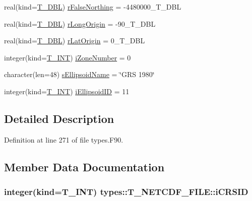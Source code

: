 \begin{DoxyCompactItemize}
\item 
real(kind=\hyperlink{namespacetypes_a888737411068474a167b1c3e5b579c58}{T\_\-DBL}) \hyperlink{typetypes_1_1_t___n_e_t_c_d_f___f_i_l_e_a03e8f9f6b812c9414c76c392b35c28a4}{rFalseNorthing} = -\/4480000\_\-T\_\-DBL
\item 
real(kind=\hyperlink{namespacetypes_a888737411068474a167b1c3e5b579c58}{T\_\-DBL}) \hyperlink{typetypes_1_1_t___n_e_t_c_d_f___f_i_l_e_addf7ab3c2b1f091b25eff5022f997522}{rLongOrigin} = -\/90\_\-T\_\-DBL
\item 
real(kind=\hyperlink{namespacetypes_a888737411068474a167b1c3e5b579c58}{T\_\-DBL}) \hyperlink{typetypes_1_1_t___n_e_t_c_d_f___f_i_l_e_a0ec0a310a81bdbc04a5574af35d4cf02}{rLatOrigin} = 0\_\-T\_\-DBL
\item 
integer(kind=\hyperlink{namespacetypes_a4e4d040a4425196c4d43be63e7e6103a}{T\_\-INT}) \hyperlink{typetypes_1_1_t___n_e_t_c_d_f___f_i_l_e_a3d905f146a75982f5e4d3f8fb1711604}{iZoneNumber} = 0
\item 
character(len=48) \hyperlink{typetypes_1_1_t___n_e_t_c_d_f___f_i_l_e_a2c4ffa327d4722e7d7650a33d5d05ed4}{sEllipsoidName} = \char`\"{}GRS 1980\char`\"{}
\item 
integer(kind=\hyperlink{namespacetypes_a4e4d040a4425196c4d43be63e7e6103a}{T\_\-INT}) \hyperlink{typetypes_1_1_t___n_e_t_c_d_f___f_i_l_e_ac7c2db95732921f3b0deb1913d6c42aa}{iEllipsoidID} = 11
\end{DoxyCompactItemize}


\subsection{Detailed Description}


Definition at line 271 of file types.F90.



\subsection{Member Data Documentation}
\hypertarget{typetypes_1_1_t___n_e_t_c_d_f___f_i_l_e_abfe48596059d830d69d4ec94f88afcbc}{
\subsubsection[{iCRSID}]{\setlength{\rightskip}{0pt plus 5cm}integer(kind={\bf T\_\-INT}) {\bf types::T\_\-NETCDF\_\-FILE::iCRSID}}}
\label{typetypes_1_1_t___n_e_t_c_d_f___f_i_l_e_abfe48596059d830d69d4ec94f88afcbc}


